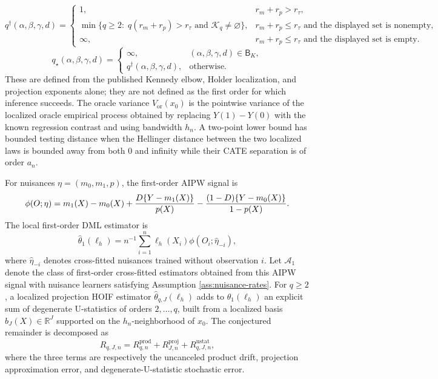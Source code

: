 \documentclass[11pt]{article}
\theoremstyle{definition}
\theoremstyle{plain}
\theoremstyle{remark}
\begin{document}
\[
q^\dagger(\alpha,\beta,\gamma,d)=
\begin{cases}
1,& r_m+r_p>r_\tau,\\
\min\{q\ge2:\;q(r_m+r_p)>r_\tau\text{ and }\mathcal K_q\ne\varnothing\},
& r_m+r_p\le r_\tau\text{ and the displayed set is nonempty},\\
\infty,& r_m+r_p\le r_\tau\text{ and the displayed set is empty}.
\end{cases}
\]
\[
q_\star(\alpha,\beta,\gamma,d)=
\begin{cases}
\infty,&(\alpha,\beta,\gamma,d)\in\mathsf B_K,\\
q^\dagger(\alpha,\beta,\gamma,d),&\text{otherwise}.
\end{cases}
\]
These are defined from the published Kennedy elbow, Holder localization, and
projection exponents alone; they are not defined as the first order for which
inference succeeds.
The oracle variance \(V_{\mathrm{or}}(x_0)\) is the pointwise variance of the
localized oracle empirical process obtained by replacing \(Y(1)-Y(0)\) with
the known regression contrast and using bandwidth \(h_n\).  A two-point lower
bound has bounded testing distance when the Hellinger distance between the two
localized laws is bounded away from both \(0\) and infinity while their CATE
separation is of order \(a_n\).

For nuisances \(\eta=(m_0,m_1,p)\), the first-order AIPW signal is
\[
\phi(O;\eta)=m_1(X)-m_0(X)
 + {D\{Y-m_1(X)\}\over p(X)}
 - {(1-D)\{Y-m_0(X)\}\over 1-p(X)}.
\]
The local first-order DML estimator is
\[
\hat\theta_1(\ell_h)=n^{-1}\sum_{i=1}^n \ell_h(X_i)\phi(O_i;\hat\eta_{-i}),
\]
where \(\hat\eta_{-i}\) denotes cross-fitted nuisances trained without
observation \(i\).  Let \(\mathcal A_1\) denote the class of first-order
cross-fitted estimators obtained from this AIPW signal with nuisance learners
satisfying Assumption \ref{ass:nuisance-rates}.  For \(q\ge2\), a localized
projection HOIF estimator
\(\hat\theta_{q,J}(\ell_h)\) adds to \(\hat\theta_1(\ell_h)\) an explicit sum
of degenerate U-statistics of orders \(2,\ldots,q\), built from a localized
basis \(b_J(X)\in\mathbb R^J\) supported on the \(h_n\)-neighborhood of
\(x_0\).  The conjectured remainder is decomposed as
\[
R_{q,J,n}=R^{\mathrm{prod}}_{q,n}+R^{\mathrm{proj}}_{J,n}
 +R^{\mathrm{ustat}}_{q,J,n},
\]
where the three terms are respectively the uncanceled product drift,
projection approximation error, and degenerate-U-statistic stochastic error.
\end{document}
